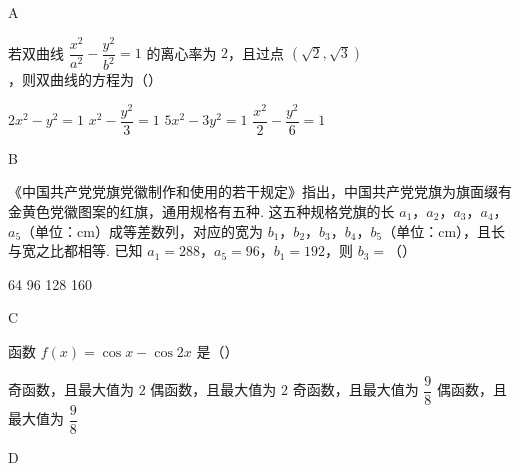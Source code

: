 \begin{answer}
A
\end{answer}

\begin{problem}
若双曲线 \(\dfrac{x^2}{a^2}-\dfrac{y^2}{b^2}=1\) 的离心率为 \(2\)，且过点 \((\sqrt2,\sqrt3)\)，则双曲线的方程为（\quad）

\choices
    {\(2x^2-y^2=1\)}
    {\(x^2-\dfrac{y^2}{3}=1\)}
    {\(5x^2-3y^2=1\)}
    {\(\dfrac{x^2}{2}-\dfrac{y^2}{6}=1\)}
\end{problem}

\begin{answer}
B
\end{answer}

\begin{problem}
《中国共产党党旗党徽制作和使用的若干规定》指出，中国共产党党旗为旗面缀有金黄色党徽图案的红旗，通用规格有五种. 这五种规格党旗的长 \(a_1\)，\(a_2\)，\(a_3\)，\(a_4\)，\(a_5\)（单位：\(\mathrm{cm}\)）成等差数列，对应的宽为 \(b_1\)，\(b_2\)，\(b_3\)，\(b_4\)，\(b_5\)（单位：\(\mathrm{cm}\)），且长与宽之比都相等. 已知 \(a_1=288\)，\(a_5=96\)，\(b_1=192\)，则 \(b_3=\)（\quad）

\choices
    {64}
    {96}
    {128}
    {160}
\end{problem}

\begin{answer}
C
\end{answer}

\begin{problem}
函数 \(f(x)=\cos x-\cos2x\) 是（\quad）

\choices
    {奇函数，且最大值为 \(2\)}
    {偶函数，且最大值为 \(2\)}
    {奇函数，且最大值为 \(\dfrac{9}{8}\)}
    {偶函数，且最大值为 \(\dfrac{9}{8}\)}
\end{problem}

\begin{answer}
D
\end{answer}

